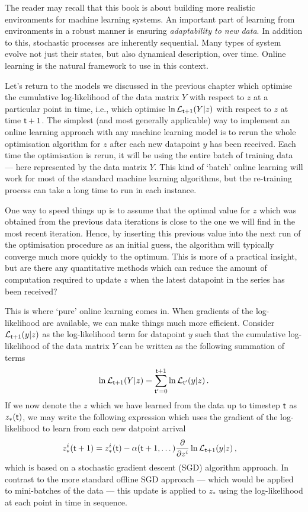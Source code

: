 The reader may recall that this book is about building more realistic environments for machine learning systems. An important part of learning from environments in a robust manner is ensuring \emph{adaptability to new data}. In addition to this, stochastic processes are inherently sequential. Many types of system evolve not just their states, but also dynamical description, over time. Online learning is the natural framework to use in this context.

Let's return to the models we discussed in the previous chapter which optimise the cumulative log-likelihood of the data matrix $Y$ with respect to $z$ at a particular point in time, i.e., which optimise $\ln {\cal L}_{{\sf t}+1}(Y\vert z)$ with respect to $z$ at time ${\sf t}+1$. The simplest (and most generally applicable) way to implement an online learning approach with any machine learning model is to rerun the whole optimisation algorithm for $z$ after each new datapoint $y$ has been received. Each time the optimisation is rerun, it will be using the entire batch of training data --- here represented by the data matrix $Y$. This kind of `batch' online learning will work for most of the standard machine learning algorithms, but the re-training process can take a long time to run in each instance. 

One way to speed things up is to assume that the optimal value for $z$ which was obtained from the previous data iterations is close to the one we will find in the most recent iteration. Hence, by inserting this previous value into the next run of the optimisation procedure as an initial guess, the algorithm will typically converge much more quickly to the optimum. This is more of a practical insight, but are there any quantitative methods which can reduce the amount of computation required to update $z$ when the latest datapoint in the series has been received?

This is where `pure' online learning comes in. When gradients of the log-likelihood are available, we can make things much more efficient. Consider ${\cal L}_{{\sf t}+1}(y\vert z)$ as the log-likelihood term for datapoint $y$ such that the cumulative log-likelihood of the data matrix $Y$ can be written as the following summation of terms
\begin{align}
\ln {\cal L}_{{\sf t}+1}(Y\vert z) = \sum^{{\sf t}+1}_{{\sf t}'=0}\ln {\cal L}_{{\sf t}'}(y\vert z)\,.
\end{align}
If we now denote the $z$ which we have learned from the data up to timestep ${\sf t}$ as $z_*({\sf t})$, we may write the following expression which uses the gradient of the log-likelihood to learn from each new datpoint arrival
\begin{align}
z^i_*({\sf t}+1) &= z^i_*({\sf t}) - \alpha ({\sf t}+1,\dots ) \frac{\partial}{\partial z^i} \ln {\cal L}_{{\sf t}+1}(y\vert z) \label{eq:sgd-online} \,,
\end{align}
which is based on a stochastic gradient descent (SGD) algorithm approach. In contrast to the more standard offline SGD approach --- which would be applied to mini-batches of the data --- this update is applied to $z_*$ using the log-likelihood at each point in time in sequence.

